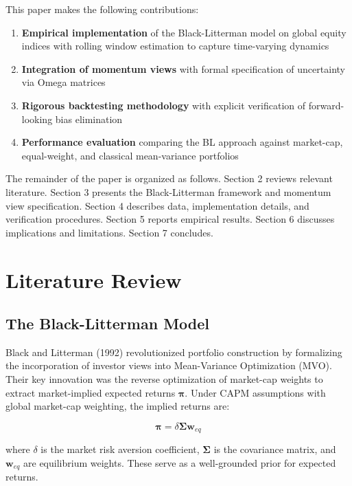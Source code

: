 \documentclass[12pt,a4paper]{article}
\begin{document}
This paper makes the following contributions:
\begin{enumerate}
\item \textbf{Empirical implementation} of the Black-Litterman model on global equity indices with rolling window estimation to capture time-varying dynamics
\item \textbf{Integration of momentum views} with formal specification of uncertainty via Omega matrices
\item \textbf{Rigorous backtesting methodology} with explicit verification of forward-looking bias elimination
\item \textbf{Performance evaluation} comparing the BL approach against market-cap, equal-weight, and classical mean-variance portfolios
\end{enumerate}

The remainder of the paper is organized as follows. Section 2 reviews relevant literature. Section 3 presents the Black-Litterman framework and momentum view specification. Section 4 describes data, implementation details, and verification procedures. Section 5 reports empirical results. Section 6 discusses implications and limitations. Section 7 concludes.

\section{Literature Review}

\subsection{The Black-Litterman Model}

Black and Litterman (1992) revolutionized portfolio construction by formalizing the incorporation of investor views into Mean-Variance Optimization (MVO). Their key innovation was the reverse optimization of market-cap weights to extract market-implied expected returns $\boldsymbol{\pi}$. Under CAPM assumptions with global market-cap weighting, the implied returns are:

\begin{equation}
\boldsymbol{\pi} = \delta \boldsymbol{\Sigma} \mathbf{w}_{eq}
\end{equation}

where $\delta$ is the market risk aversion coefficient, $\boldsymbol{\Sigma}$ is the covariance matrix, and $\mathbf{w}_{eq}$ are equilibrium weights. These serve as a well-grounded prior for expected returns.
\end{document}
